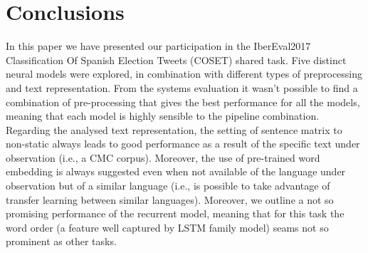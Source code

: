 \section{Conclusions} \label{sec:conclusion}

In this paper we have presented our participation in the IberEval2017 Classification Of Spanish Election Tweets (COSET) shared task. Five distinct neural models were explored, in combination with different types of preprocessing and text representation.
From the systems evaluation it wasn't possible to find a combination of pre-processing that gives the best performance for all the models, meaning that each model is highly sensible to the pipeline combination.
Regarding the analysed text representation, the setting of sentence matrix to non-static always leads to good performance as a result of the specific text under observation (i.e., a CMC corpus). Moreover, the use of pre-trained word embedding is always suggested even when not available of the language under observation but of a similar language (i.e., is possible to take advantage of transfer learning between similar languages).
Moreover, we outline a not so promising performance of the recurrent model, meaning that for this task the word order (a feature well captured by LSTM family model) seams not so prominent as other tasks.